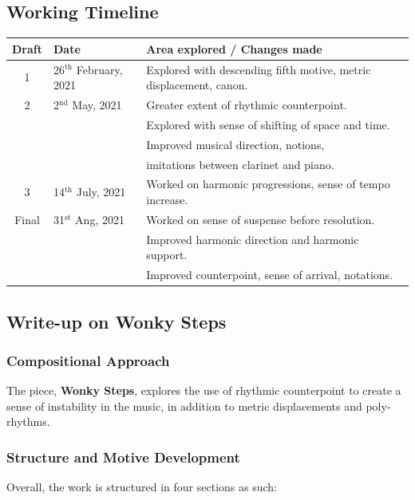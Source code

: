 \documentclass{article}
\begin{document}
\subsection{Working Timeline}
\begin{center}
	\def\arraystretch{1.5}
\begin{tabular}{|c|l|l|}
	\hline
	Draft&Date&Area explored / Changes made\\
	\hline
	1&26\(^{\text{th}}\) February, 2021&
    Explored with descending fifth motive, metric displacement, canon.\\
	\hline
    2&2\(^{\text{nd}}\) May, 2021&Greater extent of rhythmic counterpoint.\\
    &&Explored with sense of shifting of space and time.\\
    &&Improved musical direction, notions,\\
    &&imitations between clarinet and piano.\\
	\hline
	3&14\(^{\text{th}}\) July, 2021&Worked on harmonic progressions, sense of tempo increase.\\
	\hline
	Final&31\(^{\text{st}}\) Ang, 2021
    &Worked on sense of suspense before resolution.\\
    &&Improved harmonic direction and harmonic support.\\
    &&Improved counterpoint, sense of arrival, notations.\\
	\hline
\end{tabular}
\end{center}

\subsection{Write-up on {\bf Wonky Steps}}

\subsubsection{Compositional Approach}
The piece, {\bf Wonky Steps}, explores the use of rhythmic counterpoint to
create a sense of instability in the music, in addition to metric displacements
and poly-rhythms.\\

\subsubsection{Structure and Motive Development}
Overall, the work is structured in four sections as such:\\
\end{document}
